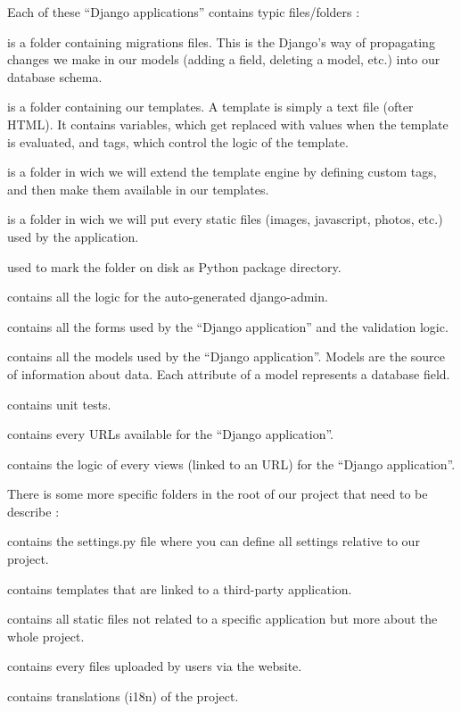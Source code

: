 \documentclass[11pt, a4paper]{article}      %
\begin{document}
Each of these ``Django applications'' contains typic files/folders :
\begin{description}[noitemsep]
\item[- migrations/] is a folder containing migrations files. This is the Django’s way of propagating changes we make in our models (adding a field, deleting a model, etc.) into our database schema.
\item[- templates/] is a folder containing our templates. A template is simply a text file (ofter HTML). It contains variables, which get replaced with values when the template is evaluated, and tags, which control the logic of the template.
\item[- Templatestags/] is a folder in wich we will extend the template engine by defining custom tags, and then make them available in our templates.
\item[- static/] is a folder in wich we will put every static files (images, javascript, photos, etc.) used by the application.
\item[- \_\_init\_\_.py] used to mark the folder on disk as Python package directory.
\item[- admin.py] contains all the logic for the auto-generated django-admin.
\item[- forms.py] contains all the forms used by the ``Django application'' and the validation logic.
\item[- models.py] contains all the models used by the ``Django application''. Models are the source of information about data. Each attribute of a model represents a database field. 
\item[- tests.py] contains unit tests.
\item[- urls.py] contains every URLs available for the ``Django application''.
\item[- views.py] contains the logic of every views (linked to an URL) for the ``Django application''.
\end{description}

There is some more specific folders in the root of our project that need to be describe :
\begin{description}[noitemsep]
\item[- care4care/] contains the settings.py file where you can define all settings relative to our project.
\item[- templates/] contains templates that are linked to a third-party application.
\item[- static/] contains all static files not related to a specific application but more about the whole project.
\item[- media\_root/] contains every files uploaded by users via the website.
\item[- locale/] contains translations (i18n) of the project.
\end{description}
\end{document}
